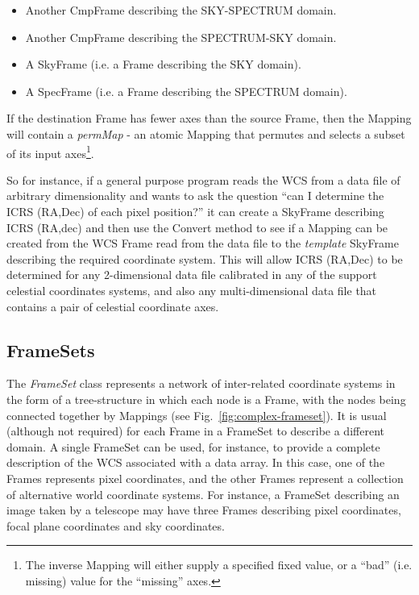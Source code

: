 \documentclass[final,authoryear,5p,times,twocolumn]{elsarticle}
\begin{document}
\begin{itemize}
\item Another CmpFrame describing the SKY-SPECTRUM domain.
\item Another CmpFrame describing the SPECTRUM-SKY domain.
\item A SkyFrame (i.e. a Frame describing the SKY domain).
\item A SpecFrame (i.e. a Frame describing the SPECTRUM domain).
\end{itemize}

If the destination Frame has fewer axes than the source Frame, then the
Mapping will contain a \emph{permMap} - an atomic Mapping that permutes
and selects a subset of its input axes\footnote{The inverse Mapping will
either supply a specified fixed value, or a ``bad'' (i.e. missing) value
for the ``missing'' axes.}.

So for instance, if a general purpose program reads the WCS from a data
file of arbitrary dimensionality and wants to ask the question ``can I
determine the ICRS (RA,Dec) of each pixel position?'' it can create a
SkyFrame describing ICRS (RA,dec) and then use the Convert method to see
if a Mapping can be created from the WCS Frame read from the data file to
the \emph{template} SkyFrame describing the required coordinate system.
This will allow ICRS (RA,Dec) to be determined for any 2-dimensional data
file calibrated in any of the support celestial coordinates systems, and
also any multi-dimensional data file that contains a pair of celestial
coordinate axes.

\subsection{FrameSets}

The \emph{FrameSet} class represents a network of inter-related
coordinate systems in the form of a tree-structure in which each node
is a Frame, with the nodes being connected together by Mappings (see
Fig.~\ref{fig:complex-frameset}). It is
usual (although not required) for each Frame in a FrameSet to describe a
different domain. A single FrameSet can be used, for instance, to provide
a complete description of the WCS associated with a data array. In this
case, one of the Frames represents pixel coordinates, and the other
Frames represent a collection of alternative world coordinate systems.
For instance, a FrameSet describing an image taken by a telescope may
have three Frames describing pixel coordinates, focal plane coordinates
and sky coordinates.
\end{document}
